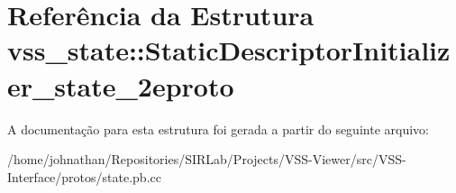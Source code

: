 \hypertarget{structvss__state_1_1StaticDescriptorInitializer__state__2eproto}{}\section{Referência da Estrutura vss\+\_\+state\+:\+:Static\+Descriptor\+Initializer\+\_\+state\+\_\+2eproto}
\label{structvss__state_1_1StaticDescriptorInitializer__state__2eproto}


A documentação para esta estrutura foi gerada a partir do seguinte arquivo\+:\begin{DoxyCompactItemize}
\item 
/home/johnathan/\+Repositories/\+S\+I\+R\+Lab/\+Projects/\+V\+S\+S-\/\+Viewer/src/\+V\+S\+S-\/\+Interface/protos/state.\+pb.\+cc\end{DoxyCompactItemize}
